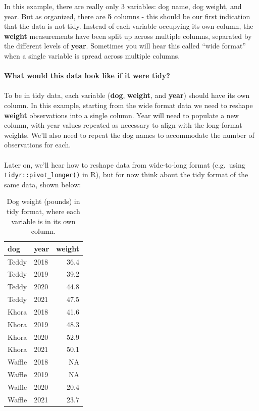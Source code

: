 \documentclass[
]{book}
\begin{document}
In this example, there are really only 3 variables: dog name, dog weight, and year. But as organized, there are \textbf{5} columns - this should be our first indication that the data is not tidy. Instead of each variable occupying its own column, the \textbf{weight} measurements have been split up across multiple columns, separated by the different levels of \textbf{year}. Sometimes you will hear this called ``wide format'' when a single variable is spread across multiple columns.\\
~\\
\textbf{What would this data look like if it were tidy?}\\
~\\
To be in tidy data, each variable (\textbf{dog}, \textbf{weight}, and \textbf{year}) should have its own column. In this example, starting from the wide format data we need to reshape \textbf{weight} observations into a single column. Year will need to populate a new column, with year values repeated as necessary to align with the long-format weights. We'll also need to repeat the dog names to accommodate the number of observations for each.\\
~\\
Later on, we'll hear how to reshape data from wide-to-long format (e.g.~using \texttt{tidyr::pivot\_longer()} in R), but for now think about the tidy format of the same data, shown below:

\begin{table}

\caption{\label{tab:unnamed-chunk-3}Dog weight (pounds) in tidy format, where each variable is in its own column.}
\centering
\begin{tabular}[t]{l|l|r}
\hline
dog & year & weight\\
\hline
Teddy & 2018 & 36.4\\
\hline
Teddy & 2019 & 39.2\\
\hline
Teddy & 2020 & 44.8\\
\hline
Teddy & 2021 & 47.5\\
\hline
Khora & 2018 & 41.6\\
\hline
Khora & 2019 & 48.3\\
\hline
Khora & 2020 & 52.9\\
\hline
Khora & 2021 & 50.1\\
\hline
Waffle & 2018 & NA\\
\hline
Waffle & 2019 & NA\\
\hline
Waffle & 2020 & 20.4\\
\hline
Waffle & 2021 & 23.7\\
\hline
\end{tabular}
\end{table}
\end{document}
